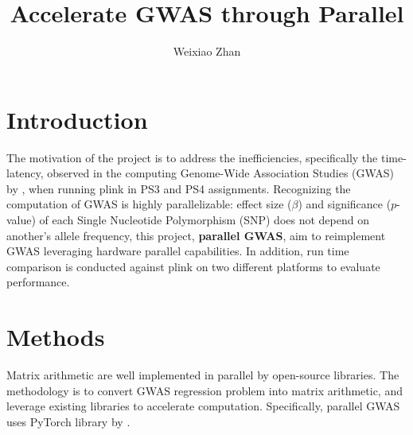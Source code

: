 \documentclass{article}
\title{Accelerate GWAS through Parallel}
\author{Weixiao Zhan}
\begin{document}
\maketitle

\section{Introduction}

The motivation of the project is to address the inefficiencies,
specifically the time-latency,
observed in the computing Genome-Wide Association Studies (GWAS) 
by \cite{uffelmann2021genome}, 
when running plink in PS3 and PS4 assignments.
Recognizing the computation of GWAS is highly 
parallelizable: effect size ($\beta$) and significance ($p$-value) 
of each Single Nucleotide Polymorphism (SNP) does not depend on 
another's allele frequency,
this project, \textbf{parallel GWAS}, aim to reimplement GWAS 
leveraging hardware parallel capabilities.
In addition, run time comparison is conducted 
against plink on two different platforms 
to evaluate performance.

\section{Methods}
Matrix arithmetic are well implemented in parallel by open-source libraries.
The methodology is to convert GWAS regression problem into matrix arithmetic,
and leverage existing libraries to accelerate computation.
Specifically, parallel GWAS uses PyTorch library by \cite{paszke2019pytorch}.
\end{document}
